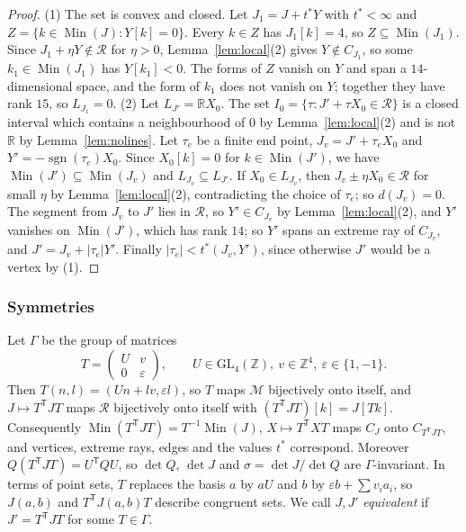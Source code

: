 \documentclass[11pt,reqno]{amsart}
\renewcommand{\_}{\origunderscore\allowbreak}
\numberwithin{equation}{section}
\theoremstyle{plain}
\theoremstyle{definition}
\theoremstyle{remark}
\newcommand{\R}{\mathbb{R}}
\newcommand{\Z}{\mathbb{Z}}
\newcommand{\M}{\mathcal{M}}
\newcommand{\Rk}{\mathcal{R}}
\newcommand{\Min}{\operatorname{Min}}
\newcommand{\GL}{\mathrm{GL}}
\begin{document}
\begin{proof}
(1) The set is convex and closed. Let $J_1=J+t^*Y$ with $t^*<\infty$ and $Z=\{k\in\Min(J):Y[k]=0\}$. Every $k\in Z$ has $J_1[k]=4$, so $Z\subseteq\Min(J_1)$. Since $J_1+\eta Y\notin\Rk$ for $\eta>0$, Lemma~\ref{lem:local}(2) gives $Y\notin C_{J_1}$, so some $k_1\in\Min(J_1)$ has $Y[k_1]<0$. The forms of $Z$ vanish on $Y$ and span a $14$-dimensional space, and the form of $k_1$ does not vanish on $Y$; together they have rank $15$, so $L_{J_1}=0$.
(2) Let $L_{J'}=\R X_0$. The set $I_0=\{\tau:J'+\tau X_0\in\Rk\}$ is a closed interval which contains a neighbourhood of $0$ by Lemma~\ref{lem:local}(2) and is not $\R$ by Lemma~\ref{lem:nolines}. Let $\tau_e$ be a finite end point, $J_v=J'+\tau_eX_0$ and $Y'=-\operatorname{sgn}(\tau_e)X_0$. Since $X_0[k]=0$ for $k\in\Min(J')$, we have $\Min(J')\subseteq\Min(J_v)$ and $L_{J_v}\subseteq L_{J'}$. If $X_0\in L_{J_v}$, then $J_v\pm\eta X_0\in\Rk$ for small $\eta$ by Lemma~\ref{lem:local}(2), contradicting the choice of $\tau_e$; so $d(J_v)=0$. The segment from $J_v$ to $J'$ lies in $\Rk$, so $Y'\in C_{J_v}$ by Lemma~\ref{lem:local}(2), and $Y'$ vanishes on $\Min(J')$, which has rank $14$; so $Y'$ spans an extreme ray of $C_{J_v}$, and $J'=J_v+|\tau_e|Y'$. Finally $|\tau_e|<t^*(J_v,Y')$, since otherwise $J'$ would be a vertex by (1).
\end{proof}

\subsubsection{Symmetries}
Let $\Gamma$ be the group of matrices
\[
T=\begin{pmatrix}U&v\\0&\varepsilon\end{pmatrix},\qquad U\in\GL_4(\Z),\ v\in\Z^4,\ \varepsilon\in\{1,-1\}.
\]
Then $T(n,l)=(Un+lv,\varepsilon l)$, so $T$ maps $\M$ bijectively onto itself, and $J\mapsto T^{\mathsf T}JT$ maps $\Rk$ bijectively onto itself with $(T^{\mathsf T}JT)[k]=J[Tk]$. Consequently $\Min(T^{\mathsf T}JT)=T^{-1}\Min(J)$, $X\mapsto T^{\mathsf T}XT$ maps $C_J$ onto $C_{T^{\mathsf T}JT}$, and vertices, extreme rays, edges and the values $t^*$ correspond. Moreover $Q(T^{\mathsf T}JT)=U^{\mathsf T}QU$, so $\det Q$, $\det J$ and $\sigma=\det J/\det Q$ are $\Gamma$-invariant. In terms of point sets, $T$ replaces the basis $a$ by $aU$ and $b$ by $\varepsilon b+\sum v_ia_i$, so $J(a,b)$ and $T^{\mathsf T}J(a,b)T$ describe congruent sets. We call $J,J'$ \emph{equivalent} if $J'=T^{\mathsf T}JT$ for some $T\in\Gamma$.
\end{document}
